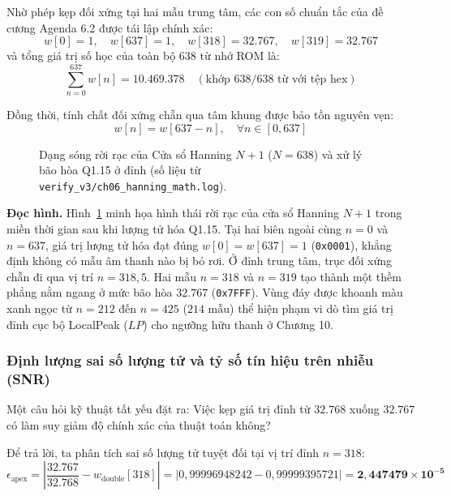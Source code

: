 Nhờ phép kẹp đối xứng tại hai mẫu trung tâm, các con số chuẩn tắc của đề cương Agenda 6.2 được tái lập chính xác:
\begin{equation}
w[0] = 1, \quad w[637] = 1, \quad w[318] = 32.767, \quad w[319] = 32.767
\end{equation}
và tổng giá trị số học của toàn bộ $638\text{ từ}$ nhớ ROM là:
\begin{equation}
\sum_{n=0}^{637} w[n] = \mathbf{10.469.378} \quad (\text{khớp 638/638 từ với tệp hex})
\end{equation}

Đồng thời, tính chất đối xứng chẵn qua tâm khung được bảo tồn nguyên vẹn:
\begin{equation}
w[n] = w[637 - n], \quad \forall n \in [0, 637]
\end{equation}

\begin{figure}[H]
\centering
\resizebox{0.92\textwidth}{!}{}
\caption{Dạng sóng rời rạc của Cửa sổ Hanning $N+1$ ($N = 638$) và xử lý bão hòa Q1.15 ở đỉnh (số liệu từ \texttt{verify\_v3/ch06\_hanning\_math.log}).}
\label{fig:ch06_window_shape}
\end{figure}

\textbf{Đọc hình.} Hình~\ref{fig:ch06_window_shape} minh họa hình thái rời rạc của cửa sổ Hanning $N+1$ trong miền thời gian sau khi lượng tử hóa Q1.15. Tại hai biên ngoài cùng $n = 0$ và $n = 637$, giá trị lượng tử hóa đạt đúng $w[0] = w[637] = 1$ (\texttt{0x0001}), khẳng định không có mẫu âm thanh nào bị bỏ rơi. Ở đỉnh trung tâm, trục đối xứng chẵn đi qua vị trí $n = 318{,}5$. Hai mẫu $n = 318$ và $n = 319$ tạo thành một thềm phẳng nằm ngang ở mức bão hòa $32.767$ (\texttt{0x7FFF}). Vùng đáy được khoanh màu xanh ngọc từ $n = 212$ đến $n = 425$ ($214\text{ mẫu}$) thể hiện phạm vi dò tìm giá trị đỉnh cục bộ LocalPeak ($LP$) cho ngưỡng hữu thanh ở Chương 10.

\subsubsection*{Định lượng sai số lượng tử và tỷ số tín hiệu trên nhiễu (SNR)}
Một câu hỏi kỹ thuật tất yếu đặt ra: Việc kẹp giá trị đỉnh từ $32.768$ xuống $32.767$ có làm suy giảm độ chính xác của thuật toán không?

Để trả lời, ta phân tích sai số lượng tử tuyệt đối tại vị trí đỉnh $n = 318$:
\begin{equation}
\epsilon_{\text{apex}} = \left| \frac{32.767}{32.768} - w_{\text{double}}[318] \right| = \left| 0{,}99996948242 - 0{,}99999395721 \right| = \mathbf{2{,}447479 \times 10^{-5}}
\end{equation}

